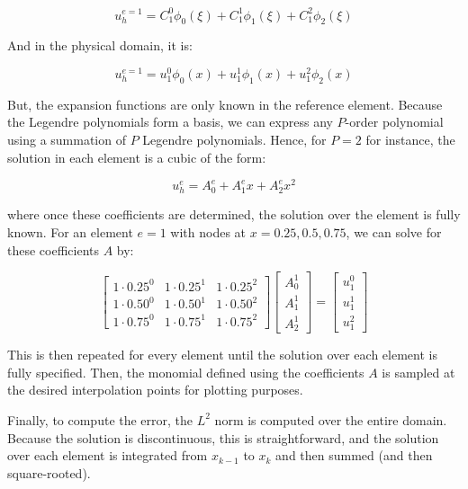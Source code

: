 \documentclass[10pt]{article}
\newcommand{\beq}{\begin{equation}}
\newcommand{\eeq}{\end{equation}}
\begin{document}
\beq
u_h^{e=1}=C_1^0\phi_0(\xi)+C_1^1\phi_1(\xi)+C_1^2\phi_2(\xi)
\eeq

And in the physical domain, it is:

\beq
u_h^{e=1}=u_1^0\phi_0(x)+u_1^1\phi_1(x)+u_1^2\phi_2(x)
\eeq

But, the expansion functions are only known in the reference element. Because the Legendre polynomials form a basis, we can express any \(P\)-order polynomial using a summation of \(P\) Legendre polynomials. Hence, for \(P=2\) for instance, the solution in each element is a cubic of the form:

\beq
u_h^e=A_0^e+A_1^ex+A_2^ex^2
\eeq

where once these coefficients are determined, the solution over the element is fully known. For an element \(e=1\) with nodes at \(x=0.25, 0.5, 0.75\), we can solve for these coefficients \(A\) by:

\beq
\begin{bmatrix}
1\cdot 0.25^0 & 1\cdot 0.25^1 & 1\cdot 0.25^2\\
1\cdot 0.50^0 & 1\cdot 0.50^1 & 1\cdot 0.50^2\\
1\cdot 0.75^0 & 1\cdot 0.75^1 & 1\cdot 0.75^2
\end{bmatrix}
\begin{bmatrix}
A_0^1\\
A_1^1\\
A_2^1
\end{bmatrix}
=
\begin{bmatrix}
u_1^0\\
u_1^1\\
u_1^2
\end{bmatrix}
\eeq

This is then repeated for every element until the solution over each element is fully specified. Then, the monomial defined using the coefficients \(A\) is sampled at the desired interpolation points for plotting purposes. 

Finally, to compute the error, the \(L^2\) norm is computed over the entire domain. Because the solution is discontinuous, this is straightforward, and the solution over each element is integrated from \(x_{k-1}\) to \(x_k\) and then summed (and then square-rooted). 





\section{}
\end{document}

